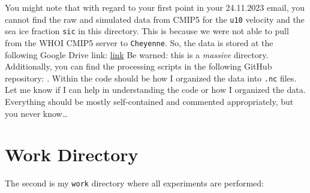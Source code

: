 \documentclass[12pt]{article}
\begin{document}
You might note that with regard to your first point in your 24.11.2023 email, you cannot find the raw and simulated data from CMIP5 for the \verb|u10| velocity and the sea ice fraction \verb|sic| in this directory. 
This is because we were not able to pull from the WHOI CMIP5 server to \verb|Cheyenne|.
So, the data is stored at the following Google Drive link:
\href{https://drive.google.com/drive/folders/1gnJkjWTys_jUcoiROkvcyBvVMBaEskNw?usp=sharing}{link}
Be warned: this is a \emph{massive} directory. 
Additionally, you can find the processing scripts in the following GitHub repository:
\href{}{}.
Within the code should be how I organized the data into \verb|.nc| files. 
Let me know if I can help in understanding the code or how I organized the data.
Everything should be mostly self-contained and commented appropriately, but you never know\ldots

\section*{Work Directory}
The second is my \verb|work| directory where all experiments are performed:
\medskip
{}
\end{document}
